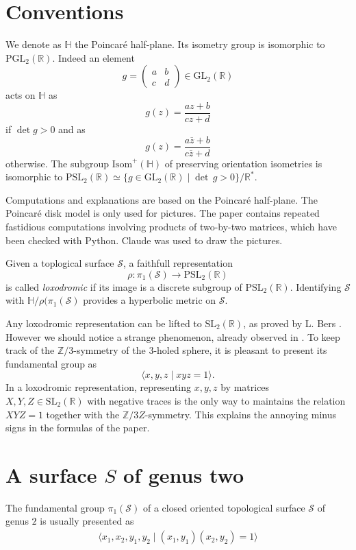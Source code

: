 \documentclass[10pt,a4paper]{amsart}
\newcommand{\HP}{\mathbb{H}}
\newcommand{\R}{\mathbb{R}}
\newcommand{\Z}{\mathbb{Z}}
\newcommand{\GL}{{\mathrm {GL}}}
\newcommand{\Isom}{\mathrm{Isom}}
\newcommand{\PGL}{{\mathrm {PGL}}}
\newcommand{\PSL}{{\mathrm {PSL}}}
\newcommand{\SL}{{\mathrm {SL}}}
\newcommand{\cS}{\mathcal{S}}
\begin{document}
\section{Conventions}

We denote as $\HP$ the Poincar\'e half-plane.
Its isometry group is isomorphic to
$\PGL_2(\R)$. Indeed an element
$$g=\begin{pmatrix} a&b\\c&d
\end{pmatrix}\in \GL_2(\R)$$
\noindent acts on $\HP$ as
$$g(z)=\frac{az+b}{cz+d}$$
\noindent if $\det g >0$ and as
$$g(z)=\frac{a\overline{z}+b}{c\overline{z}+d}$$
\noindent otherwise. The subgroup $\Isom^+(\HP)$ of preserving orientation isometries is isomorphic to 
$\PSL_2(\R)\simeq \{g\in \GL_2(\R)\mid \det\,g>0\}/\R^*.$

Computations and explanations are based on the Poincar\'e half-plane. The Poincar\'e disk model is only used for pictures.
The paper contains repeated fastidious computations involving products of two-by-two matrices, which have been checked with Python. Claude was used to draw the pictures.

Given a toplogical  surface $\cS$, a 
 faithfull representation 
$$\rho:\pi_1(\cS)\to\PSL_2(\R)$$
 is called {\it loxodromic} if its
image is a discrete subgroup of $\PSL_2(\R)$. Identifying
$\cS$ with $\HP/\rho(\pi_1(\cS)$ provides a hyperbolic metric
on $\cS$.

Any loxodromic representation can be lifted
to $\SL_2(\R)$, as  proved by L. Bers \cite{Bers}. 
However we should notice a strange phenomenon, already observed in \cite{Bers}. To keep track of the 
$\Z/3$-symmetry of the $3$-holed sphere, it is pleasant to present its fundamental group as
$$\langle x, y, z\mid xyz=1\rangle.$$
In a loxodromic representation, representing $x, y, z$ by matrices 
$X, Y, Z \in \SL_2(\R)$ with negative traces is the only way to maintains the relation
$XYZ=1$ together with the $\Z/3Z$-symmetry. This explains the 
annoying minus signs in the formulas of the paper.











\section{A surface $S$ of genus two}

The fundamental group  $\pi_1(\cS)$ 
of a closed oriented topological surface $\cS$ of genus $2$ is usually presented as
\begin{align}\langle x_1,x_2,y_1,y_2\mid 
(x_1,y_1)(x_2,y_2)=1\rangle \label{standard}\end{align}
\end{document}
